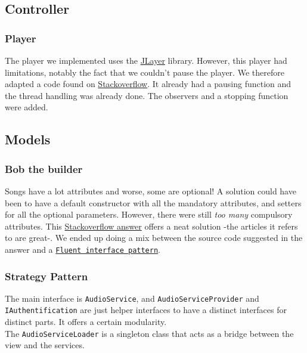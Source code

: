 \documentclass{report}
\begin{document}
{\subsection{Controller}

\subsubsection{Player}

The player we implemented uses the \href{http://www.javazoom.net/javalayer/javalayer.html}{JLayer} library. However, this player had limitations, notably the fact that we couldn't pause the player. We therefore adapted a code found on \href{http://stackoverflow.com/questions/12057214/jlayer-pause-and-resume-song}{Stackoverflow}. It already had a pausing function and the thread handling was already done. The observers and a stopping function were added.

\subsection{Models}

\subsubsection{Bob the builder}
Songs have a lot attributes and worse, some are optional! A solution could have been to have a default constructor with all the mandatory attributes, and setters for all the optional parameters. However, there were still \textit{too many} compulsory attributes. This \href{http://stackoverflow.com/a/40324/5795409}{Stackoverflow answer} offers a neat solution -the articles it refers to are great-. We ended up doing a mix between the source code suggested in the answer and a \href{https://dzone.com/articles/factories-builders-and-fluent-}{\texttt{Fluent interface pattern}}.

\subsubsection{Strategy Pattern}
The main interface is \texttt{AudioService},  and \texttt{AudioServiceProvider} and \texttt{IAuthentification} are just helper interfaces to have a distinct interfaces for distinct parts. It offers a certain modularity. \\
The \texttt{AudioServiceLoader} is a singleton class that acts as a bridge between the view and the services. 
}
\end{document}
